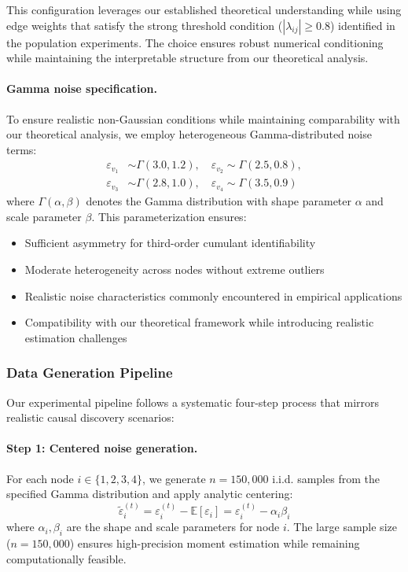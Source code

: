 \documentclass[11pt,a4paper]{article}
\numberwithin{equation}{section}
\begin{document}
This configuration leverages our established theoretical understanding while using edge weights that satisfy the strong threshold condition ($|\lambda_{ij}| \geq 0.8$) identified in the population experiments. The choice ensures robust numerical conditioning while maintaining the interpretable structure from our theoretical analysis.

\paragraph{Gamma noise specification.} To ensure realistic non-Gaussian conditions while maintaining comparability with our theoretical analysis, we employ heterogeneous Gamma-distributed noise terms:
\begin{align}
\varepsilon_{v_1} &\sim \Gamma(3.0, 1.2), \quad \varepsilon_{v_2} \sim \Gamma(2.5, 0.8), \\
\varepsilon_{v_3} &\sim \Gamma(2.8, 1.0), \quad \varepsilon_{v_4} \sim \Gamma(3.5, 0.9)
\end{align}
where $\Gamma(\alpha, \beta)$ denotes the Gamma distribution with shape parameter $\alpha$ and scale parameter $\beta$. This parameterization ensures:
\begin{itemize}
\item Sufficient asymmetry for third-order cumulant identifiability
\item Moderate heterogeneity across nodes without extreme outliers
\item Realistic noise characteristics commonly encountered in empirical applications
\item Compatibility with our theoretical framework while introducing realistic estimation challenges
\end{itemize}

\subsubsection{Data Generation Pipeline}

Our experimental pipeline follows a systematic four-step process that mirrors realistic causal discovery scenarios:

\paragraph{Step 1: Centered noise generation.} For each node $i \in \{1,2,3,4\}$, we generate $n = 150{,}000$ i.i.d. samples from the specified Gamma distribution and apply analytic centering:
\begin{equation}
\tilde{\varepsilon}_i^{(t)} = \varepsilon_i^{(t)} - \mathbb{E}[\varepsilon_i] = \varepsilon_i^{(t)} - \alpha_i \beta_i
\end{equation}
where $\alpha_i, \beta_i$ are the shape and scale parameters for node $i$. The large sample size ($n = 150{,}000$) ensures high-precision moment estimation while remaining computationally feasible.
\end{document}
